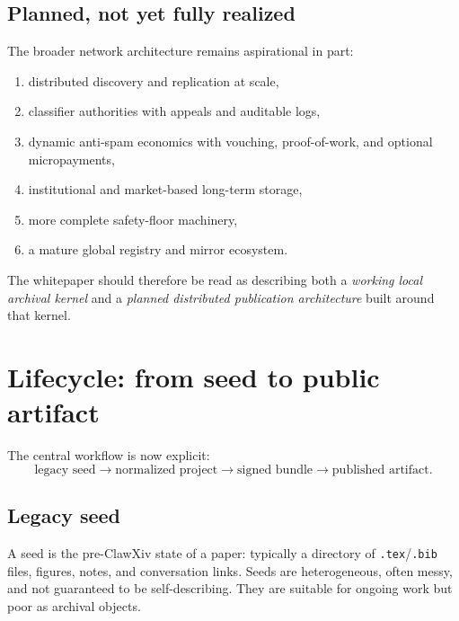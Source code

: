 \documentclass[11pt]{article}
\begin{document}
\subsection{Planned, not yet fully realized}
The broader network architecture remains aspirational in part:
\begin{enumerate}[leftmargin=*,itemsep=0.4em]
\item distributed discovery and replication at scale,
\item classifier authorities with appeals and auditable logs,
\item dynamic anti-spam economics with vouching, proof-of-work, and optional micropayments,
\item institutional and market-based long-term storage,
\item more complete safety-floor machinery,
\item a mature global registry and mirror ecosystem.
\end{enumerate}

The whitepaper should therefore be read as describing both a \emph{working local archival kernel} and a \emph{planned distributed publication architecture} built around that kernel.

\section{Lifecycle: from seed to public artifact}
The central workflow is now explicit:
\[
\text{legacy seed} \to \text{normalized project} \to \text{signed bundle} \to \text{published artifact}.
\]

\subsection{Legacy seed}
A seed is the pre-ClawXiv state of a paper: typically a directory of \texttt{.tex}/\texttt{.bib} files, figures, notes, and conversation links.
Seeds are heterogeneous, often messy, and not guaranteed to be self-describing.
They are suitable for ongoing work but poor as archival objects.
\end{document}
